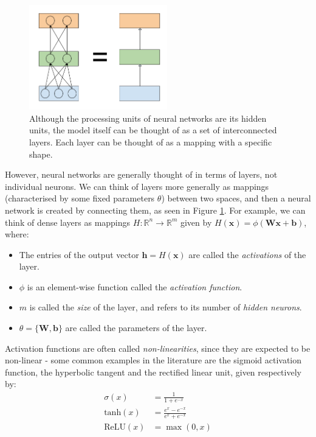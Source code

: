 \documentclass[pdftex,12pt,a4paper]{article}
\theoremstyle{definition}
\theoremstyle{remark}
\newcommand*{\V}[1]{\mathbf{#1}}%
\begin{document}
\begin{figure}[h]
    \centering
    \includegraphics[width=6cm]{figs/mlp.png}
    \caption{Although the processing units of neural networks are its hidden units, the model itself can be thought of as a set of interconnected layers. Each layer can be thought of as a mapping with a specific shape.}
    \label{fig:mlp}
\end{figure}

\par However, neural networks are generally thought of in terms of layers, not individual neurons. We can think of layers more generally as mappings (characterised by some fixed parameters $\theta$) between two spaces, and then a neural network is created by connecting them, as seen in Figure \ref{fig:mlp}. For example, we can think of dense layers as mappings $H:\mathbb{R}^n \rightarrow \mathbb{R}^m$ given by $H(\V{x}) = \phi(\V{Wx}+\V{b})$, where:

\begin{itemize}
    \item The entries of the output vector $\V{h} = H(\V{x})$ are called the \textit{activations} of the layer.
    \item $\phi$ is an element-wise function called the \textit{activation function}.
    \item $m$ is called the \textit{size} of the layer, and refers to its number of \textit{hidden neurons}.
    \item $\theta = \{\V{W, b}\}$ are called the parameters of the layer.
\end{itemize}

\par Activation functions are often called \textit{non-linearities}, since they are expected to be non-linear - some common examples in the literature are the sigmoid activation function, the hyperbolic tangent and the rectified linear unit, given respectively by:
\begin{align*}
    \sigma(x) &= \frac{1}{1+e^{-x}}\\
    \text{tanh}(x) &= \frac{e^x - e^{-x}}{e^x + e^{-x}}\\
    \text{ReLU}(x) &= \max(0, x)
\end{align*}
\end{document}
